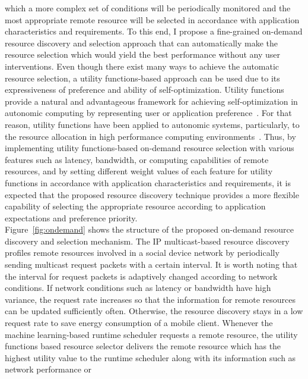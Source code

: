 which a more complex set of conditions will be periodically monitored and the
most appropriate remote resource will be selected in accordance with
application characteristics and requirements.
%
To this end, I propose a fine-grained on-demand resource discovery and
selection approach that can automatically make the resource selection which would
yield the best performance without any user interventions.
%
Even though there exist many ways to achieve the automatic
resource selection, a utility functions-based approach can be used due to
its expressiveness of preference and ability of self-optimization.
%
Utility functions provide a natural and advantageous framework for
achieving self-optimization in autonomic computing by representing user
or application preference~\cite{utility}.
%
For that reason, utility functions have been applied to autonomic systems,
particularly, to the resource allocation in high performance computing
environments~\cite{william, david, terence, paul}.
%
Thus, by implementing utility functions-based on-demand resource
selection with various features such as latency, bandwidth, or computing
capabilities of remote resources, and by setting different weight values
of each feature for utility functions in accordance with application
characteristics and requirements, it is expected that the proposed
resource discovery technique provides a more flexible capability of
selecting the appropriate resource according to application expectations
and preference priority.\\
%
Figure~\ref{fig:ondemand} shows the structure of the proposed on-demand 
resource discovery and selection mechanism. 
%
The IP multicast-based resource discovery profiles remote
resources involved in a social device network by periodically sending
multicast request packets with a certain interval.
%
It is worth noting that the interval for request packets is adaptively
changed according to network conditions.
%
If network conditions such as latency or bandwidth have high variance,
the request rate increases so that the information for remote resources 
can be updated sufficiently often.
%
%
Otherwise, the resource discovery stays in a low request rate to save
energy consumption of a mobile client. 
%
Whenever the machine learning-based runtime scheduler requests a remote
resource, the utility functions based resource selector delivers the
remote resource which has the highest utility value to the runtime
scheduler along with its information such as network performance or
